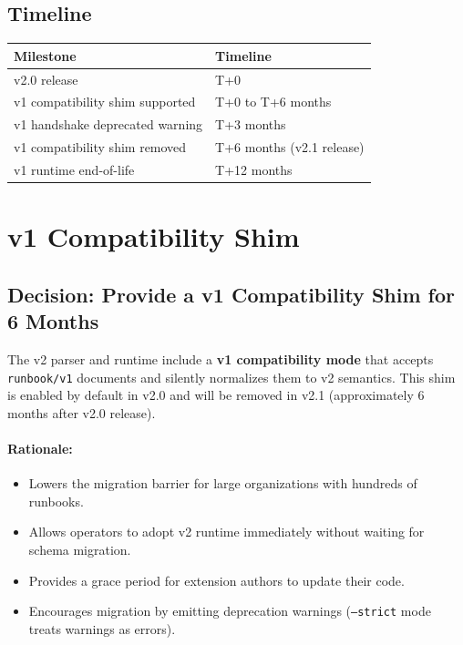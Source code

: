 \subsection{Timeline}

\begin{center}
\begin{tabular}{lp{10cm}}
\textbf{Milestone} & \textbf{Timeline} \\
\hline
v2.0 release & T+0 \\
v1 compatibility shim supported & T+0 to T+6 months \\
v1 handshake deprecated warning & T+3 months \\
v1 compatibility shim removed & T+6 months (v2.1 release) \\
v1 runtime end-of-life & T+12 months \\
\end{tabular}
\end{center}

\section{v1 Compatibility Shim}
\label{sec:v1-shim}

\subsection{Decision: Provide a v1 Compatibility Shim for 6 Months}

The v2 parser and runtime include a \textbf{v1 compatibility mode} that accepts \texttt{runbook/v1} documents and silently normalizes them to v2 semantics. This shim is enabled by default in v2.0 and will be removed in v2.1 (approximately 6 months after v2.0 release).

\paragraph{Rationale:}
\begin{itemize}
  \item Lowers the migration barrier for large organizations with hundreds of runbooks.
  \item Allows operators to adopt v2 runtime immediately without waiting for schema migration.
  \item Provides a grace period for extension authors to update their code.
  \item Encourages migration by emitting deprecation warnings (\texttt{--strict} mode treats warnings as errors).
\end{itemize}

